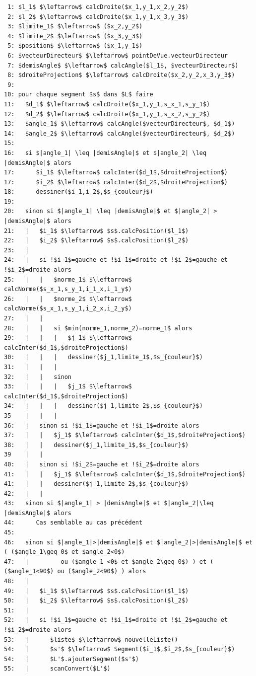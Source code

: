 \documentclass[11pt,a4paper]{article}
\theoremstyle{definition}
\theoremstyle{remark}
\begin{document}
\begin{lstlisting}
 1: $l_1$ $\leftarrow$ calcDroite($x_1,y_1,x_2,y_2$)
 2: $l_2$ $\leftarrow$ calcDroite($x_1,y_1,x_3,y_3$)
 3: $limite_1$ $\leftarrow$ ($x_2,y_2$)
 4: $limite_2$ $\leftarrow$ ($x_3,y_3$)
 5: $position$ $\leftarrow$ ($x_1,y_1$)
 6: $vecteurDirecteur$ $\leftarrow$ pointDeVue.vecteurDirecteur
 7: $demisAngle$ $\leftarrow$ calcAngle($l_1$, $vecteurDirecteur$)
 8: $droiteProjection$ $\leftarrow$ calcDroite($x_2,y_2,x_3,y_3$)
 9: 
10: pour chaque segment $s$ dans $L$ faire
11:   $d_1$ $\leftarrow$ calcDroite($x_1,y_1,s_x_1,s_y_1$)
12:   $d_2$ $\leftarrow$ calcDroite($x_1,y_1,s_x_2,s_y_2$)
13:   $angle_1$ $\leftarrow$ calcAngle($vecteurDirecteur$, $d_1$)
14:   $angle_2$ $\leftarrow$ calcAngle($vecteurDirecteur$, $d_2$)
15:
16:   si $|angle_1| \leq |demisAngle|$ et $|angle_2| \leq |demisAngle|$ alors
17:      $i_1$ $\leftarrow$ calcInter($d_1$,$droiteProjection$)
17:      $i_2$ $\leftarrow$ calcInter($d_2$,$droiteProjection$)
18:      dessiner($i_1,i_2$,$s_{couleur}$)
19:
20:   sinon si $|angle_1| \leq |demisAngle|$ et $|angle_2| > |demisAngle|$ alors
21:   |   $i_1$ $\leftarrow$ $s$.calcPosition($l_1$)
22:   |   $i_2$ $\leftarrow$ $s$.calcPosition($l_2$)
23:   |
24:   |   si !$i_1$=gauche et !$i_1$=droite et !$i_2$=gauche et !$i_2$=droite alors
25:   |   |   $norme_1$ $\leftarrow$ calcNorme($s_x_1,s_y_1,i_1_x,i_1_y$)
26:   |   |   $norme_2$ $\leftarrow$ calcNorme($s_x_1,s_y_1,i_2_x,i_2_y$)
27:   |   |   
28:   |   |   si $min(norme_1,norme_2)=norme_1$ alors
29:   |   |   |   $j_1$ $\leftarrow$ calcInter($d_1$,$droiteProjection$)
30:   |   |   |   dessiner($j_1,limite_1$,$s_{couleur}$)
31:   |   |   |
32:   |   |   sinon
33:   |   |   |   $j_1$ $\leftarrow$ calcInter($d_1$,$droiteProjection$)
34:   |   |   |   dessiner($j_1,limite_2$,$s_{couleur}$)
35    |   |   |
36:   |   sinon si !$i_1$=gauche et !$i_1$=droite alors
37:   |   |   $j_1$ $\leftarrow$ calcInter($d_1$,$droiteProjection$)
38:   |   |   dessiner($j_1,limite_1$,$s_{couleur}$)
39    |   |
40:   |   sinon si !$i_2$=gauche et !$i_2$=droite alors
41:   |   |   $j_1$ $\leftarrow$ calcInter($d_1$,$droiteProjection$)
41:   |   |   dessiner($j_1,limite_2$,$s_{couleur}$)
42:   |   |
43:   sinon si $|angle_1| > |demisAngle|$ et $|angle_2|\leq |demisAngle|$ alors
44:      Cas semblable au cas précédent
45:
46:   sinon si $|angle_1|>|demisAngle|$ et $|angle_2|>|demisAngle|$ et ( ($angle_1\geq 0$ et $angle_2<0$)
47:   |         ou ($angle_1 <0$ et $angle_2\geq 0$) ) et ( ($angle_1<90$) ou ($angle_2<90$) ) alors
48:   |
49:   |   $i_1$ $\leftarrow$ $s$.calcPosition($l_1$)
50:   |   $i_2$ $\leftarrow$ $s$.calcPosition($l_2$)
51:   |
52:   |   si !$i_1$=gauche et !$i_1$=droite et !$i_2$=gauche et !$i_2$=droite alors
53:   |      $liste$ $\leftarrow$ nouvelleListe()
54:   |      $s'$ $\leftarrow$ Segment($i_1$,$i_2$,$s_{couleur}$)
54:   |      $L'$.ajouterSegment($s'$)
55:   |      scanConvert($L'$)
\end{lstlisting}
\restoregeometry
\end{document}
